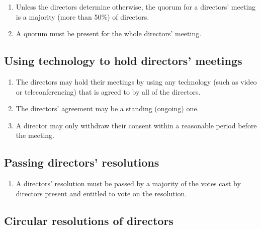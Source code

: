 \documentclass[a4paper]{article}
\begin{document}
\begin{enumerate}
\item Unless the directors determine otherwise, the quorum for a directors' meeting is a majority (more than 50\%) of directors.
\item A quorum must be present for the whole directors' meeting.
\end{enumerate}

\subsection{Using technology to hold directors' meetings}

\begin{enumerate}
\item The directors may hold their meetings by using any technology (such as video or teleconferencing) that is agreed to by all of the directors.
\item The directors' agreement may be a standing (ongoing) one.
\item A director may only withdraw their consent within a reasonable period before the meeting.
\end{enumerate}

\subsection{Passing directors' resolutions}

\begin{enumerate}
\item A directors' resolution must be passed by a majority of the votes cast by directors present and entitled to vote on the resolution.
\end{enumerate}

\subsection{Circular resolutions of directors}
\end{document}
